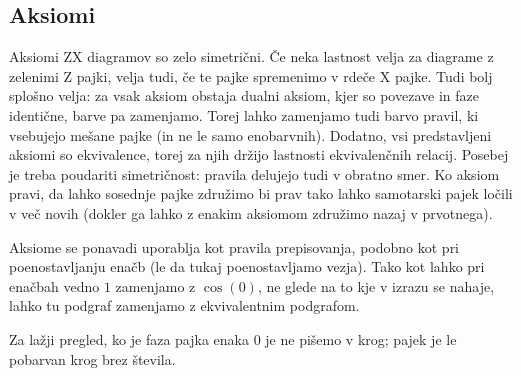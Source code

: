 \documentclass[mat1]{fmfdelo}
\begin{document}
\subsection{Aksiomi}
Aksiomi ZX diagramov so zelo simetrični. Če neka lastnost velja za diagrame z zelenimi Z pajki, velja tudi, če te pajke spremenimo v rdeče X pajke. Tudi bolj splošno velja: za vsak aksiom obstaja dualni aksiom, kjer so povezave in faze identične, barve pa zamenjamo. Torej lahko zamenjamo tudi barvo pravil, ki vsebujejo mešane pajke (in ne le samo enobarvnih). Dodatno, vsi predstavljeni aksiomi so ekvivalence, torej za njih držijo lastnosti ekvivalenčnih relacij. Posebej je treba poudariti simetričnost: pravila delujejo tudi v obratno smer. Ko aksiom pravi, da lahko sosednje pajke združimo bi prav tako lahko samotarski pajek ločili v več novih (dokler ga lahko z enakim aksiomom združimo nazaj v prvotnega).

Aksiome se ponavadi uporablja kot pravila prepisovanja, podobno kot pri poenostavljanju enačb (le da tukaj poenostavljamo vezja). Tako kot lahko pri enačbah vedno \(1\) zamenjamo z \(\cos(0)\), ne glede na to kje v izrazu se nahaje, lahko tu podgraf zamenjamo z ekvivalentnim podgrafom.

Za lažji pregled, ko je faza pajka enaka \(0\) je ne pišemo v krog; pajek je le pobarvan krog brez števila.
\end{document}
